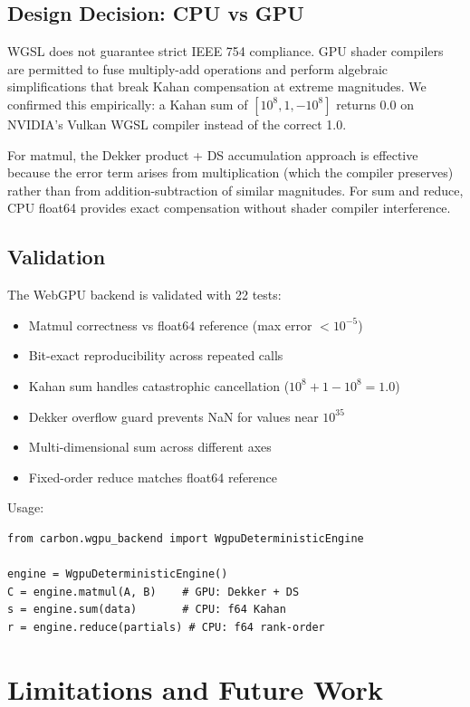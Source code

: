 \documentclass[11pt,a4paper]{article}
\begin{document}
\subsection{Design Decision: CPU vs GPU}

WGSL does not guarantee strict IEEE 754 compliance. GPU shader compilers are
permitted to fuse multiply-add operations and perform algebraic simplifications
that break Kahan compensation at extreme magnitudes. We confirmed this
empirically: a Kahan sum of $[10^8, 1, -10^8]$ returns 0.0 on NVIDIA's Vulkan
WGSL compiler instead of the correct 1.0.

For matmul, the Dekker product + DS accumulation approach is effective because
the error term arises from multiplication (which the compiler preserves) rather
than from addition-subtraction of similar magnitudes. For sum and reduce, CPU
float64 provides exact compensation without shader compiler interference.

\subsection{Validation}

The WebGPU backend is validated with 22 tests:
\begin{itemize}
  \item Matmul correctness vs float64 reference (max error $< 10^{-5}$)
  \item Bit-exact reproducibility across repeated calls
  \item Kahan sum handles catastrophic cancellation ($10^8 + 1 - 10^8 = 1.0$)
  \item Dekker overflow guard prevents NaN for values near $10^{35}$
  \item Multi-dimensional sum across different axes
  \item Fixed-order reduce matches float64 reference
\end{itemize}

Usage:
\begin{lstlisting}
from carbon.wgpu_backend import WgpuDeterministicEngine

engine = WgpuDeterministicEngine()
C = engine.matmul(A, B)    # GPU: Dekker + DS
s = engine.sum(data)       # CPU: f64 Kahan
r = engine.reduce(partials) # CPU: f64 rank-order
\end{lstlisting}

\section{Limitations and Future Work}
\end{document}

